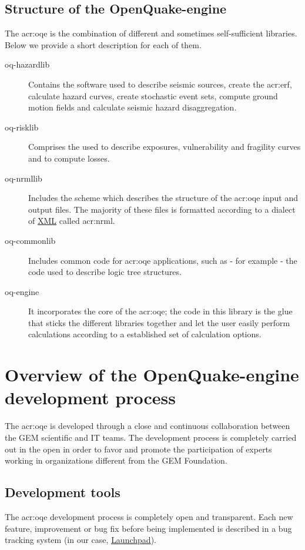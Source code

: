 \subsection{Structure of the OpenQuake-engine}
The \gls{acr:oqe} is the combination of different and sometimes 
self-sufficient libraries. Below we provide a short description for each of
them.
\begin{description}
    \item [oq-hazardlib] Contains the software used to describe 
        seismic sources, create the \gls{acr:erf}, calculate hazard curves, 
        create stochastic event sets, compute ground motion fields and 
        calculate seismic hazard disaggregation.
    \item [oq-risklib] Comprises the used to describe exposures, vulnerability 
        and fragility curves and to compute losses.
    \item [oq-nrmllib] Includes the scheme which describes the structure of 
        the \gls{acr:oqe} input and output files. The majority of these files 
        is formatted according to a dialect of 
        \href{http://www.w3.org/XML/}{XML} called \gls{acr:nrml}. 
    \item [oq-commonlib] Includes common code for \gls{acr:oqe} applications,
        such as - for example - the code used to describe logic tree structures.
    \item [oq-engine] It incorporates the core of the \gls{acr:oqe}; the code in
        this library is the glue that sticks the different libraries together 
        and let the user easily perform calculations according to a established 
        set of calculation options.
\end{description}
%
\section{Overview of the OpenQuake-engine development process}
%
The \gls{acr:oqe} is developed through a close and continuous collaboration 
between the GEM scientific and IT teams. The development process is completely
carried out in the open in order to favor and promote the
participation of experts working in organizations different from the GEM 
Foundation.
%
\subsection{Development tools}
%
The \gls{acr:oqe} development process is completely open and transparent. Each
new feature, improvement or bug fix before being implemented is described 
in a bug tracking system (in our case, 
\href{https://launchpad.net/}{Launchpad}).  

